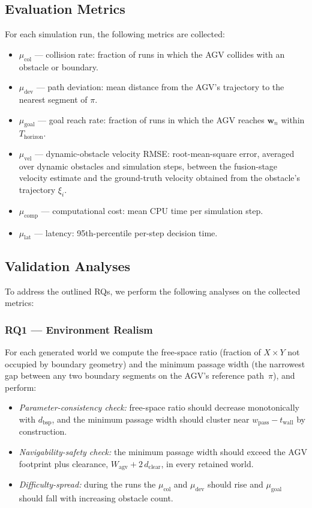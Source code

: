 \documentclass[conference]{IEEEtran}
\begin{document}
\subsection{Evaluation Metrics}
\label{sec:metrics}
For each simulation run, the following metrics are collected:
\begin{itemize}
    \item $\mu_{\text{col}}$ --- collision rate: fraction of runs in which the AGV collides with an obstacle or boundary.
    \item $\mu_{\text{dev}}$ --- path deviation: mean distance from the AGV's trajectory to the nearest segment of $\pi$.
    \item $\mu_{\text{goal}}$ --- goal reach rate: fraction of runs in which the AGV reaches $\mathbf{w}_n$ within $T_{\text{horizon}}$.
    \item $\mu_{\text{vel}}$ --- dynamic-obstacle velocity RMSE: root-mean-square error, averaged over dynamic obstacles and simulation steps, between the fusion-stage velocity estimate and the ground-truth velocity obtained from the obstacle's trajectory $\xi_i$.
    \item $\mu_{\text{comp}}$ --- computational cost: mean CPU time per simulation step.
    \item $\mu_{\text{lat}}$ --- latency: 95th-percentile per-step decision time.
\end{itemize}

\subsection{Validation Analyses}
\label{sec:analyses}
To address the outlined RQs, we perform the following analyses on the collected metrics:

\subsubsection{RQ1 --- Environment Realism}
For each generated world we compute the free-space ratio (fraction of $X\times Y$ not occupied by boundary geometry) and the minimum passage width (the narrowest gap between any two boundary segments on the AGV's reference path~$\pi$), and perform:
\begin{itemize}
    \item \textit{Parameter-consistency check:} free-space ratio should decrease monotonically with $d_{\text{bsp}}$, and the minimum passage width should cluster near $w_{\text{pass}}-t_{\text{wall}}$ by construction.
    \item \textit{Navigability-safety check:} the minimum passage width should exceed the AGV footprint plus clearance, $W_{\text{agv}}+2\,d_{\text{clear}}$, in every retained world.
    \item \textit{Difficulty-spread:} during the runs the $\mu_{\text{col}}$ and $\mu_{\text{dev}}$ should rise and $\mu_{\text{goal}}$ should fall with increasing obstacle count.
\end{itemize}
\end{document}
